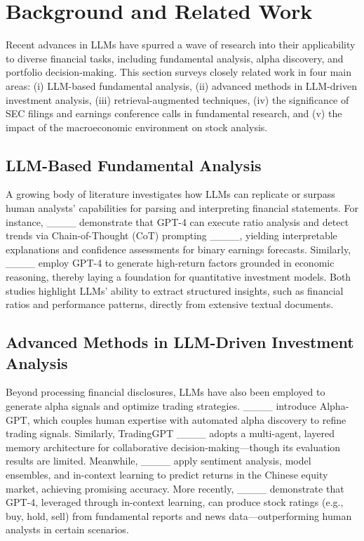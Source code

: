 \section{Background and Related Work}
\label{sec:2}

Recent advances in LLMs have spurred a wave of research into their applicability to diverse financial tasks, including fundamental analysis, alpha discovery, and portfolio decision-making. This section surveys closely related work in four main areas: (i) LLM-based fundamental analysis, (ii) advanced methods in LLM-driven investment analysis, (iii) retrieval-augmented techniques, (iv) the significance of SEC filings and earnings conference calls in fundamental research, and (v) the impact of the macroeconomic environment on stock analysis.

\subsection{LLM-Based Fundamental Analysis}
A growing body of literature investigates how LLMs can replicate or surpass human analysts’ capabilities for parsing and interpreting financial statements. For instance, ____ demonstrate that GPT-4 can execute ratio analysis and detect trends via Chain-of-Thought (CoT) prompting ____, yielding interpretable explanations and confidence assessments for binary earnings forecasts. Similarly, ____ employ GPT-4 to generate high-return factors grounded in economic reasoning, thereby laying a foundation for quantitative investment models. Both studies highlight LLMs’ ability to extract structured insights, such as financial ratios and performance patterns, directly from extensive textual documents.

\subsection{Advanced Methods in LLM-Driven Investment Analysis}
Beyond processing financial disclosures, LLMs have also been employed to generate alpha signals and optimize trading strategies. ____ introduce Alpha-GPT, which couples human expertise with automated alpha discovery to refine trading signals. Similarly, TradingGPT ____ adopts a multi-agent, layered memory architecture for collaborative decision-making—though its evaluation results are limited. Meanwhile, ____ apply sentiment analysis, model ensembles, and in-context learning to predict returns in the Chinese equity market, achieving promising accuracy. More recently, ____ demonstrate that GPT-4, leveraged through in-context learning, can produce stock ratings (e.g., buy, hold, sell) from fundamental reports and news data—outperforming human analysts in certain scenarios.


